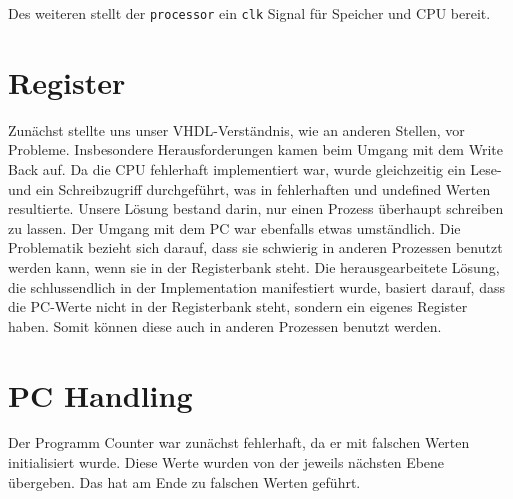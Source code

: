 \documentclass[paper=a4,fontsize=12pt,twocolumn]{scrreprt}
\begin{document}
Des weiteren stellt der \texttt{processor} ein \texttt{clk} Signal für Speicher und CPU bereit.

\section{Register}





Zunächst stellte uns unser VHDL-Verständnis, wie an anderen Stellen, vor Probleme.
Insbesondere Herausforderungen kamen beim Umgang mit dem Write Back auf.
Da die CPU fehlerhaft implementiert war, wurde gleichzeitig ein Lese- und ein Schreibzugriff durchgeführt, was in fehlerhaften und undefined Werten resultierte. 
Unsere Lösung bestand darin, nur einen Prozess überhaupt schreiben zu lassen. Der Umgang mit dem PC war ebenfalls etwas umständlich.
Die Problematik bezieht sich darauf, dass sie schwierig in anderen Prozessen benutzt werden kann, wenn sie in der Registerbank steht.
Die herausgearbeitete Lösung, die schlussendlich in der Implementation manifestiert wurde, basiert darauf, dass die PC-Werte nicht in der Registerbank steht, sondern ein eigenes Register haben.
Somit können diese auch in anderen Prozessen benutzt werden.


\section{PC Handling}

Der Programm Counter war zunächst fehlerhaft, da er mit falschen Werten initialisiert wurde. Diese Werte wurden von der jeweils nächsten Ebene übergeben. Das hat am Ende zu falschen Werten geführt. 
\end{document}
